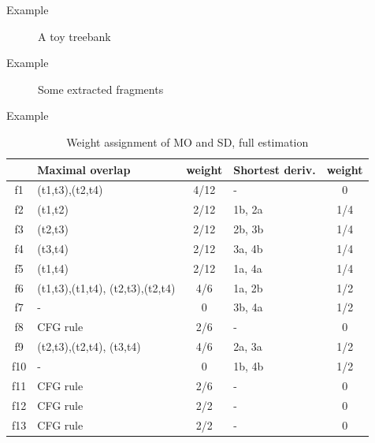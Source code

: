 \documentclass{beamer}
\begin{document}
\begin{frame}{Example}
\begin{figure}

\caption{A toy treebank}
\end{figure}
\end{frame}

\begin{frame}{Example}
\begin{figure}

\caption{Some extracted fragments}
\end{figure}
\end{frame}

\begin{frame}{Example}
\begin{table}
\footnotesize
\begin{tabular}{c|p{}c|p{}c|}
&Maximal overlap&weight&Shortest deriv.\footnotemark&weight\\\hline
f1&(t1,t3),(t2,t4)&4/12&-&0\\
f2&(t1,t2)&2/12&1b, 2a&1/4\\
f3&(t2,t3)&2/12&2b, 3b&1/4\\
f4&(t3,t4)&2/12&3a, 4b&1/4\\
f5&(t1,t4)&2/12&1a, 4a&1/4\\
f6&(t1,t3),(t1,t4), (t2,t3),(t2,t4)&4/6&1a, 2b&1/2\\
f7&-&0&3b, 4a&1/2\\
f8&CFG rule&2/6&-&0\\
f9&(t2,t3),(t2,t4), (t3,t4)&4/6&2a, 3a&1/2\\
f10&-&0&1b, 4b&1/2\\
f11&CFG rule&2/6&-&0\\
f12&CFG rule&2/2&-&0\\
f13&CFG rule&2/2&-&0\\
\end{tabular}

\caption{Weight assignment of MO and SD, full estimation}
\end{table}

\end{frame}
\end{document}
